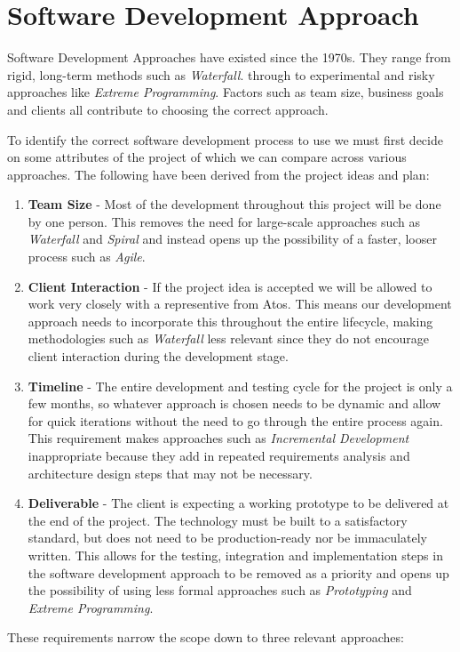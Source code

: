 \section{Software Development Approach}

Software Development Approaches have existed since the 1970s. They range from rigid, long-term methods such as \emph{Waterfall}. through to experimental and risky approaches like \emph{Extreme Programming}. Factors such as team size, business goals and clients all contribute to choosing the correct approach.

To identify the correct software development process to use we must first decide on some attributes of the project of which we can compare across various approaches. The following have been derived from the project ideas and plan:

\begin{enumerate}
  \item \textbf{Team Size} -
    Most of the development throughout this project will be done by one person. This removes the need for large-scale approaches such as \emph{Waterfall} and \emph{Spiral} and instead opens up the possibility of a faster, looser process such as \emph{Agile}.
  \item \textbf{Client Interaction} - 
    If the project idea is accepted we will be allowed to work very closely with a representive from Atos. This means our development approach needs to incorporate this throughout the entire lifecycle, making methodologies such as \emph{Waterfall} less relevant since they do not encourage client interaction during the development stage.
  \item \textbf{Timeline} - 
    The entire development and testing cycle for the project is only a few months, so whatever approach is chosen needs to be dynamic and allow for quick iterations without the need to go through the entire process again. This requirement makes approaches such as \emph{Incremental Development} inappropriate because they add in repeated requirements analysis and architecture design steps that may not be necessary.
  \item \textbf{Deliverable} -
    The client is expecting a working prototype to be delivered at the end of the project. The technology must be built to a satisfactory standard, but does not need to be production-ready nor be immaculately written. This allows for the testing, integration and implementation steps in the software development approach to be removed as a priority and opens up the possibility of using less formal approaches such as \emph{Prototyping} and \emph{Extreme Programming}.
\end{enumerate}
These requirements narrow the scope down to three relevant approaches:

